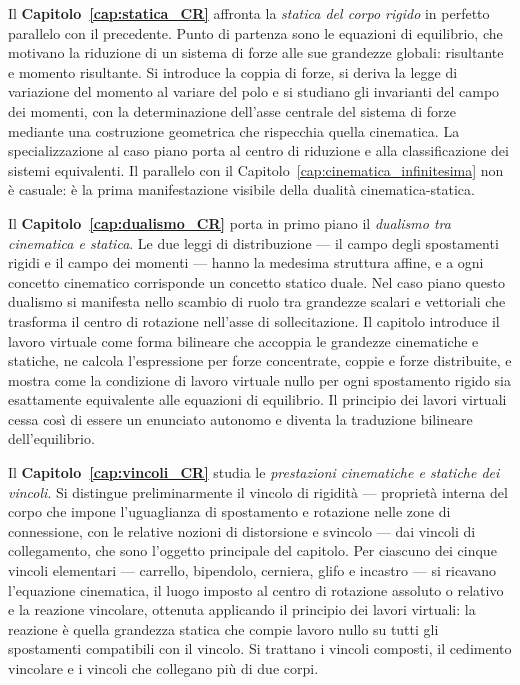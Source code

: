 Il \textbf{Capitolo~\ref{cap:statica_CR}} affronta la \emph{statica del corpo rigido} in
perfetto parallelo con il precedente. Punto di partenza sono le equazioni di equilibrio,
che motivano la riduzione di un sistema di forze alle sue grandezze globali: risultante e
momento risultante. Si introduce la coppia di forze, si deriva la legge di variazione del
momento al variare del polo e si studiano gli invarianti del campo dei momenti, con la
determinazione dell'asse centrale del sistema di forze mediante una costruzione geometrica
che rispecchia quella cinematica. La specializzazione al caso piano porta al centro di
riduzione e alla classificazione dei sistemi equivalenti. Il parallelo con il
Capitolo~\ref{cap:cinematica_infinitesima} non è casuale: è la prima manifestazione
visibile della dualità cinematica-statica.

Il \textbf{Capitolo~\ref{cap:dualismo_CR}} porta in primo piano il \emph{dualismo tra
	cinematica e statica}. Le due leggi di distribuzione --- il campo degli spostamenti rigidi
e il campo dei momenti --- hanno la medesima struttura affine, e a ogni concetto cinematico
corrisponde un concetto statico duale. Nel caso piano questo dualismo si manifesta nello
scambio di ruolo tra grandezze scalari e vettoriali che trasforma il centro di rotazione
nell'asse di sollecitazione. Il capitolo introduce il lavoro virtuale come forma bilineare
che accoppia le grandezze cinematiche e statiche, ne calcola l'espressione per forze
concentrate, coppie e forze distribuite, e mostra come la condizione di lavoro virtuale nullo
per ogni spostamento rigido sia esattamente equivalente alle equazioni di equilibrio. Il
principio dei lavori virtuali cessa così di essere un enunciato autonomo e diventa la
traduzione bilineare dell'equilibrio.

Il \textbf{Capitolo~\ref{cap:vincoli_CR}} studia le \emph{prestazioni cinematiche e statiche
	dei vincoli}. Si distingue preliminarmente il vincolo di rigidità --- proprietà interna
del corpo che impone l'uguaglianza di spostamento e rotazione nelle zone di connessione,
con le relative nozioni di distorsione e svincolo --- dai vincoli di collegamento, che sono
l'oggetto principale del capitolo. Per ciascuno dei cinque vincoli elementari --- carrello,
bipendolo, cerniera, glifo e incastro --- si ricavano l'equazione cinematica, il luogo
imposto al centro di rotazione assoluto o relativo e la reazione vincolare, ottenuta
applicando il principio dei lavori virtuali: la reazione è quella grandezza statica che
compie lavoro nullo su tutti gli spostamenti compatibili con il vincolo. Si trattano i
vincoli composti, il cedimento vincolare e i vincoli che collegano più di due corpi.

